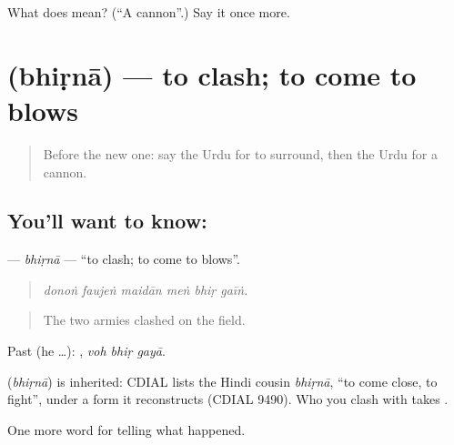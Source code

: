 \begin{tcolorbox}[breakable,colback=teal!4,colframe=teal!35!black,title={Before you move on}]
What does  mean? (\textquotedblleft{}A cannon\textquotedblright{}.) Say it once more.
\end{tcolorbox}
\section[\texorpdfstring{\ur{بھڑنا} (bhiṛnā)}{بھڑنا (bhiṛnā)}]{ (bhiṛnā) — to clash; to come to blows}

\label{lesson:UR-C309-bhirna}



\begin{quote}
Before the new one: say the Urdu for to surround, then the Urdu for a cannon.
\end{quote}

\subsection*{You'll want to know: }
\textbf{} — \emph{bhiṛnā} — \textquotedblleft{}to clash; to come to blows\textquotedblright{}.

\begin{quote}
     
\end{quote}

\begin{quote}
\emph{donoṅ faujeṅ maidān meṅ bhiṛ gaīṅ.}
\end{quote}

\begin{quote}
The two armies clashed on the field.
\end{quote}

Past (he …):   , \emph{voh bhiṛ gayā}.

\begin{cousinweb}
\textbf{} (\emph{bhiṛnā}) is inherited: CDIAL lists the Hindi cousin \emph{bhiṛnā}, \textquotedblleft{}to come close, to fight\textquotedblright{}, under a form it reconstructs (CDIAL 9490). Who you clash with takes \textbf{}.
\end{cousinweb}

\begin{grammarlens}[title={What you've built}]
One more word for telling what happened.
\end{grammarlens}

